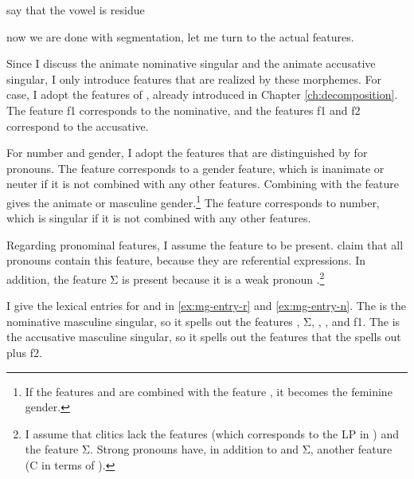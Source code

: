 say that the vowel is residue

now we are done with segmentation, let me turn to the actual features.

Since I discuss the animate nominative singular and the animate accusative singular, I only introduce features that are realized by these morphemes.
For case, I adopt the features of \citet{caha2009}, already introduced in Chapter \ref{ch:decomposition}. The feature \ac{f}1 corresponds to the nominative, and the features \ac{f}1 and \ac{f}2 correspond to the accusative.

For number and gender, I adopt the features that are distinguished by \citet{harley2002} for pronouns. The feature  corresponds to a gender feature, which is inanimate or neuter if it is not combined with any other features. Combining  with the feature  gives the animate or masculine gender.\footnote{
If the features  and  are combined with the feature , it becomes the feminine gender.
}
The feature  corresponds to number, which is singular if it is not combined with any other features.

Regarding pronominal features, I assume the feature  to be present. \citet{harley2002} claim that all pronouns contain this feature, because they are referential expressions. In addition, the feature Σ is present because it is a weak pronoun \citep{cardinaletti1994}.\footnote{
I assume that clitics lack the features  (which corresponds to the LP in ) and the feature Σ. Strong pronouns have, in addition to  and Σ, another feature (C in terms of ).
}


I give the lexical entries for  and  in \ref{ex:mg-entry-r} and \ref{ex:mg-entry-n}.
The  is the nominative masculine singular, so it spells out the features , Σ, , ,  and \ac{f}1. The  is the accusative masculine singular, so it spells out the features that the  spells out plus \ac{f}2.

